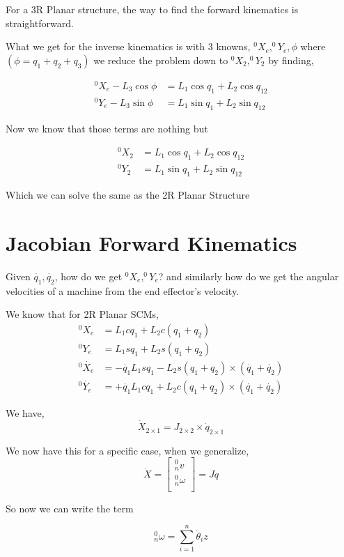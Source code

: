 \documentclass[11pt]{report}
\begin{document}
For a 3R Planar structure, the way to find the forward kinematics is straightforward.

What we get for the inverse kinematics is with 3 knowns, \(^0X_e, ^0Y_e, \phi\) where \((\phi = q_1 + q_2 + q_3)\) we reduce the problem down to \(^0X_{2}, ^0Y_2\) by finding,

\begin{align*}
^0X_e - L_3 \cos{\phi} &= L_{1} \cos q_1 + L_2 \cos q_{12}\\
^0Y_e - L_3 \sin{\phi} &= L_{1}\sin q_1 + L_2 \sin q_{12}
\end{align*}

Now we know that those terms are nothing but

\begin{align*}
^0X_{2}&= L_{1} \cos q_1 + L_2 \cos q_{12}\\
^0Y_{2} &= L_{1}\sin q_1 + L_2 \sin q_{12}
\end{align*}

Which we can solve the same as the 2R Planar Structure
\section{Jacobian Forward Kinematics}
\label{sec:orga385595}
Given \(\dot{q_{1}}, \dot{q_{2}}\), how do we get \(^0X_{e}, ^0Y_e\)? and similarly how do we get the angular velocities of a machine from the end effector's velocity.

We know that for 2R Planar SCMs,
\begin{align*}
^0X_e &= L_1 c q_1  + L_2 c(q_1 + q_2) \\
^0Y_e &= L_1 s q_1 + L_2 s(q_1+q_2) \\
^0\dot{X_e} &= -\dot{q_1}L_1 s q_1 - L_2s(q_{1}+q_2)\times(\dot{q_1} + \dot{q_2}) \\
^0\dot{Y_e} &= +\dot{q_1}L_1 c q_1 + L_2c(q_{1}+q_2)\times(\dot{q_1} + \dot{q_2})
\end{align*}

We have,
$$\dot{X}_{2\times1} = J_{2 \times2} \times \dot{q}_{2 \times1}$$


We now have this for a specific case, when we generalize,
$$ \dot{X} =  \begin{bmatrix} ^0_nv \\ ^0_n\omega \\ \end{bmatrix} = J \dot{q}$$

So now we can write the term

$$^0_{n}\omega = \sum_{i=1}^n \dot{\theta}_i z$$
\end{document}
